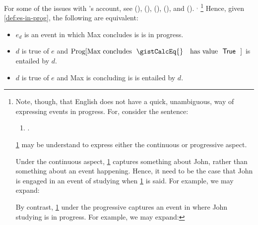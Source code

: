 \begin{note}
{    For some of the issues with \citeauthor{Landman:1992wh}'s account, see (\cite{Bonomi:1997uq}), (\cite[49--50]{Engelberg:1999vi}), (\cite[35]{Szabo:2004ul}), (\cite[767]{Portner:1998um}), and (\cite[esp.][1256]{Portner:2011vi}).
  }%
  \(^{,}\)%
  \footnote{
    Note, though, that English does not have a quick, unambiguous, way of expressing events in progress.
  For, consider the sentence:
  \begin{enumerate}[label=\arabic*., ref=(\arabic*)]
  \item
    \label{prog:abmig}
    .
  \end{enumerate}
  \ref{prog:abmig} may be understand to express either the continuous or progressive aspect.

  Under the continuous aspect, \ref{prog:abmig} captures something about John, rather than something about an event happening.
  Hence, it need to be the case that John is engaged in an event of studying when \ref{prog:abmig} is said.
  For example, we may expand:

  By contrast, \ref{prog:abmig} under the progressive captures an event in where John studying is in progress.
  For example, we may expand:
  }
  Hence, given \autoref{def:es-in-prog}, the following are equivalent:
  \begin{itemize}
  \item
    \(e_{d}\) is an event in which Max concludes \propM{\gistCalcEq{}} is  is in progress.
  \item
    \(d\) is true of \(e\) and \(\text{Prog}[\text{Max concludes \propM{\gistCalcEq{}} has value \valI{True}}]\) is entailed by \(d\).
  \item
    \(d\) is true of \(e\) and Max is concluding \propM{\gistCalcEq{}} is  is entailed by \(d\).
  \end{itemize}

\end{note}


